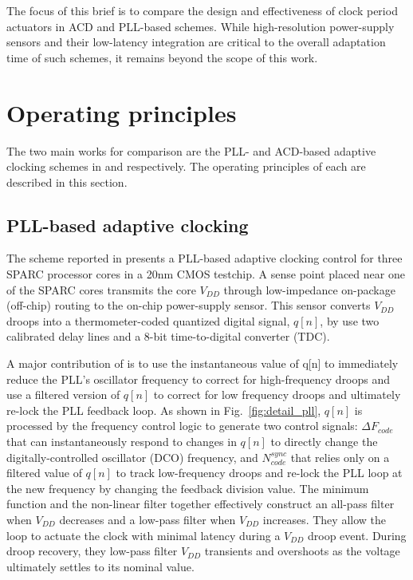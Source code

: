 \documentclass[twoside,9pt,journal,letterpage]{IEEEtran}
\begin{document}
The focus of this brief is to compare the design and effectiveness of clock period actuators in ACD and PLL-based schemes. While high-resolution power-supply sensors and their low-latency integration are critical to the overall adaptation time of such schemes, it remains beyond the scope of this work.

\section{Operating principles}
\label{sec:details}
The two main works for comparison are the PLL- and ACD-based adaptive clocking schemes in \cite{hashimoto2018} and \cite{wilcox2015} respectively. The operating principles of each are described in this section.

\vspace{-10pt}
\subsection{PLL-based adaptive clocking}
\label{sec:details_pll}
The scheme reported in \cite{hashimoto2018} presents a PLL-based adaptive clocking control for three SPARC processor cores in a 20nm CMOS testchip. A sense point placed near one of the SPARC cores transmits the core $V_{DD}$ through low-impedance on-package (off-chip) routing to the on-chip power-supply sensor. This sensor converts $V_{DD}$ droops into a thermometer-coded quantized digital signal, $q[n]$, by use two calibrated delay lines and a 8-bit time-to-digital converter (TDC). 

A major contribution of \cite{hashimoto2018} is to use the instantaneous value of q[n] to immediately reduce the PLL's oscillator frequency to correct for high-frequency droops and use a filtered version of $q[n]$ to correct for low frequency droops and ultimately re-lock the PLL feedback loop. As shown in Fig.\ \ref{fig:detail_pll}, %
$q[n]$ is processed by the frequency control logic to generate two control signals: $\Delta F_{code}$ that can instantaneously respond to changes in $q[n]$ to directly change the digitally-controlled oscillator (DCO) frequency, and $N^{sync}_{code}$ that relies only on a filtered value of $q[n]$ to track low-frequency droops and re-lock the PLL loop at the new frequency by changing the feedback division value. The minimum function and the non-linear filter together effectively construct an all-pass filter when $V_{DD}$ decreases and a low-pass filter when $V_{DD}$ increases. They allow the loop to actuate the clock with minimal latency during a $V_{DD}$ droop event. During droop recovery, they low-pass filter $V_{DD}$ transients and overshoots as the voltage ultimately settles to its nominal value.
\end{document}
